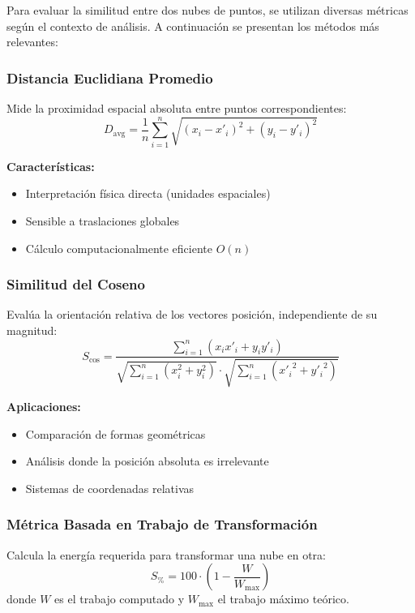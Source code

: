 Para evaluar la similitud entre dos nubes de puntos, se utilizan diversas métricas según el contexto de análisis. A continuación se presentan los métodos más relevantes:

\subsubsection{Distancia Euclidiana Promedio}
\label{subsec:dist-euclid}
Mide la proximidad espacial absoluta entre puntos correspondientes:
\begin{equation}
D_{\text{avg}} = \frac{1}{n} \sum_{i=1}^n \sqrt{(x_i - x'_i)^2 + (y_i - y'_i)^2}
\end{equation}

\textbf{Características:}
\begin{itemize}
    \item Interpretación física directa (unidades espaciales)
    \item Sensible a traslaciones globales
    \item Cálculo computacionalmente eficiente $O(n)$
\end{itemize}

\subsubsection{Similitud del Coseno}
\label{subsec:cos-sim}
Evalúa la orientación relativa de los vectores posición, independiente de su magnitud:
\begin{equation}
S_{\cos} = \frac{\sum_{i=1}^n (x_i x'_i + y_i y'_i)}{\sqrt{\sum_{i=1}^n (x_i^2 + y_i^2)} \cdot \sqrt{\sum_{i=1}^n ({x'_i}^2 + {y'_i}^2)}}
\end{equation}

\textbf{Aplicaciones:}
\begin{itemize}
    \item Comparación de formas geométricas
    \item Análisis donde la posición absoluta es irrelevante
    \item Sistemas de coordenadas relativas
\end{itemize}

\subsubsection{Métrica Basada en Trabajo de Transformación}
\label{subsec:work-metric}
Calcula la energía requerida para transformar una nube en otra:
\begin{equation}
S_{\%} = 100 \cdot \left(1 - \frac{W}{W_{\max}}\right)
\end{equation}
donde $W$ es el trabajo computado y $W_{\max}$ el trabajo máximo teórico.

